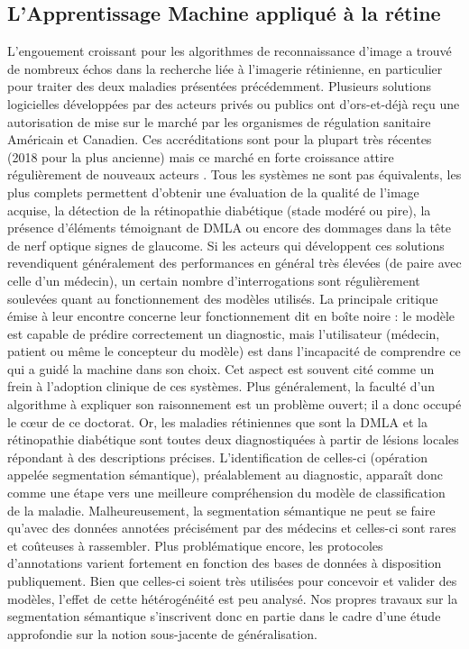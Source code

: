 \subsection{L'Apprentissage Machine appliqué à la rétine}
L'engouement croissant pour les algorithmes de reconnaissance d'image a trouvé de nombreux échos dans la recherche liée à l'imagerie rétinienne, en particulier pour traiter des deux maladies présentées précédemment. Plusieurs solutions logicielles développées par des acteurs privés ou publics ont d'ors-et-déjà reçu une autorisation de mise sur le marché par les organismes de régulation sanitaire Américain et Canadien. Ces accréditations sont pour la plupart très récentes (2018 pour la plus ancienne) mais ce marché en forte croissance attire régulièrement de nouveaux acteurs \cite{pressAIDiabeticRetinopathy, EyenukAnnouncesFDA2020}.
Tous les systèmes ne sont pas équivalents, les plus complets permettent d'obtenir une évaluation de la qualité de l'image acquise, la détection de la rétinopathie diabétique (stade modéré ou pire), la présence d'éléments témoignant de \ac{DMLA} ou encore des dommages dans la tête de nerf optique signes de glaucome. Si les acteurs qui développent ces solutions revendiquent généralement des performances en général très élevées (de paire avec celle d'un médecin), un certain nombre d'interrogations sont régulièrement soulevées quant au fonctionnement des modèles utilisés. La principale critique émise à leur encontre concerne leur fonctionnement dit \og en boîte noire \fg: le modèle est capable de prédire correctement un diagnostic, mais l'utilisateur (médecin, patient ou même le concepteur du modèle) est dans l'incapacité de comprendre ce qui a guidé la machine dans son choix. Cet aspect est souvent cité comme un frein à l'adoption clinique de ces systèmes. Plus généralement, la faculté d'un algorithme à expliquer son \og raisonnement \fg est un problème ouvert; il a donc occupé le c\oe{}ur de ce doctorat. Or, les maladies rétiniennes que sont la DMLA et la rétinopathie diabétique sont toutes deux diagnostiquées à partir de lésions locales répondant à des descriptions précises. L'identification de celles-ci (opération appelée segmentation sémantique), préalablement au diagnostic, apparaît donc comme une étape vers une meilleure compréhension du modèle de classification de la maladie. Malheureusement, la segmentation sémantique ne peut se faire qu'avec des données annotées précisément par des médecins et 
celles-ci sont rares et coûteuses à rassembler. Plus problématique encore, les protocoles d'annotations varient fortement en fonction des bases de données à disposition publiquement. Bien que celles-ci soient très utilisées pour concevoir et valider des modèles, l'effet de cette hétérogénéité est peu analysé. Nos propres travaux sur la segmentation sémantique s'inscrivent donc en partie dans le cadre d'une étude approfondie sur la notion sous-jacente de généralisation. \\
